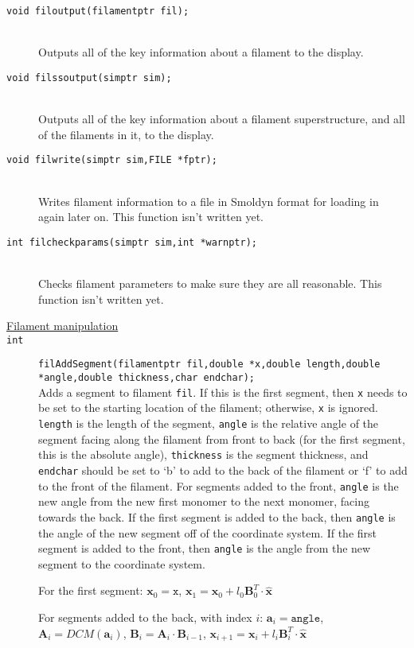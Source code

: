 \documentclass {scrbook}
\newcommand {\ttt} {\texttt}
\begin{document}
\begin{description}
\item[\ttt{void filoutput(filamentptr fil);}]
\hfill \\
Outputs all of the key information about a filament to the display.

\item[\ttt{void filssoutput(simptr sim);}]
\hfill \\
Outputs all of the key information about a filament superstructure, and all of the filaments in it, to the display.

\item[\ttt{void filwrite(simptr sim,FILE *fptr);}]
\hfill \\
Writes filament information to a file in Smoldyn format for loading in again later on. This function isn't written yet.

\item[\ttt{int filcheckparams(simptr sim,int *warnptr);}]
\hfill \\
Checks filament parameters to make sure they are all reasonable. This function isn't written yet.

\item[\underline{Filament manipulation}]

\item[\ttt{int}]
\ttt{filAddSegment(filamentptr fil,double *x,double length,double *angle,double thickness,char endchar);}
\hfill \\
Adds a segment to filament \ttt{fil}. If this is the first segment, then \ttt{x} needs to be set to the starting location of the filament; otherwise, \ttt{x} is ignored. \ttt{length} is the length of the segment, \ttt{angle} is the relative angle of the segment facing along the filament from front to back (for the first segment, this is the absolute angle), \ttt{thickness} is the segment thickness, and \ttt{endchar} should be set to `b' to add to the back of the filament or `f' to add to the front of the filament. For segments added to the front, \ttt{angle} is the new angle from the new first monomer to the next monomer, facing towards the back. If the first segment is added to the back, then \ttt{angle} is the angle of the new segment off of the coordinate system. If the first segment is added to the front, then \ttt{angle} is the angle from the new segment to the coordinate system.

For the first segment:
$\mathbf{x}_0=\ttt{x}$,
$\mathbf{x}_1=\mathbf{x}_0 + l_0 \mathbf{B}^T_0 \cdot \mathbf{\hat{x}}$

For segments added to the back, with index $i$:
$\mathbf{a}_i = \ttt{angle}$,
$\mathbf{A}_i = DCM(\mathbf{a}_i)$,
$\mathbf{B}_i = \mathbf{A}_i \cdot \mathbf{B}_{i-1}$,
$\mathbf{x}_{i+1} = \mathbf{x}_i + l_i \mathbf{B}^T_i \cdot \mathbf{\hat{x}}$


\end{description}
\end{document}
